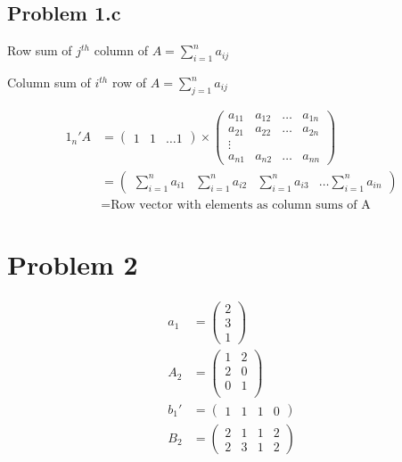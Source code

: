 \documentclass[a4paper]{article}
\begin{document}
\subsection*{Problem 1.c}
Row sum of $j^{th}$ column of $A = \sum_{i=1}^na_{ij}$

Column sum of $i^{th}$ row of $A= \sum_{j=1}^n a_{ij}$

\begin{align*}
1_n'A &= \begin{pmatrix} 1 & 1 & \dots 1 \end{pmatrix} \times \begin{pmatrix} a_{11} & a_{12} & \dots & a_{1n} \\
a_{21} & a_{22}  & \dots & a_{2n}\\
\vdots\\
a_{n1} & a_{n2} & \dots  & a_{nn}
\end{pmatrix}\\
&= \begin{pmatrix} \sum_{i=1}^n a_{i1} & \sum_{i=1}^n a_{i2} & \sum_{i=1}^n a_{i3}  & \dots \sum_{i=1}^n a_{in} \end{pmatrix}\\
&= \text{Row vector with elements as column sums of A}
\end{align*}

\section*{Problem 2}

\begin{align*}
a_1 &= \begin{pmatrix}
2\\
3\\
1
\end{pmatrix}\\
A_2 &= \begin{pmatrix}
1 & 2\\
2 & 0\\
0 & 1\\
\end{pmatrix}\\
b_1' &= \begin{pmatrix}
1 & 1 & 1 & 0
\end{pmatrix}\\
B_2 &= \begin{pmatrix}
2 & 1 & 1 & 2\\
2 & 3 & 1 & 2
\end{pmatrix}
\end{align*}
\end{document}
